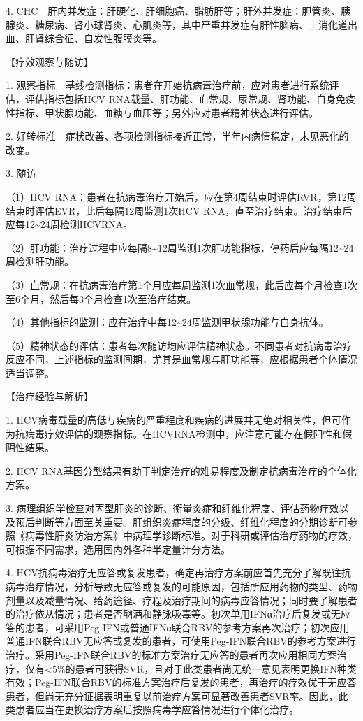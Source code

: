 4.
CHC　肝内并发症：肝硬化、肝细胞癌、脂肪肝等；肝外并发症：胆管炎、胰腺炎、糖尿病、肾小球肾炎、心肌炎等，其中严重并发症有肝性脑病、上消化道出血、肝肾综合征、自发性腹膜炎等。

【疗效观察与随访】

1.
观察指标　基线检测指标：患者在开始抗病毒治疗前，应对患者进行系统评估，评估指标包括HCV
RNA载量、肝功能、血常规、尿常规、肾功能、自身免疫性指标、甲状腺功能、血糖与血压等；另外应对患者精神状态进行评估。

2.
好转标准　症状改善、各项检测指标接近正常，半年内病情稳定，未见恶化的改变。

3. 随访

（1）HCV
RNA：患者在抗病毒治疗开始后，应在第4周结束时评估RVR，第12周结束时评估EVR，此后每隔12周监测1次HCV
RNA，直至治疗结束。治疗结束后应每12\textasciitilde{}24周检测HCVRNA。

（2）肝功能：治疗过程中应每隔8\textasciitilde{}12周监测1次肝功能指标，停药后应每隔12\textasciitilde{}24周检测肝功能。

（3）血常规：在抗病毒治疗第1个月应每周监测1次血常规，此后应每个月检查1次至6个月，然后每3个月检查1次至治疗结束。

（4）其他指标的监测：应在治疗中每12\textasciitilde{}24周监测甲状腺功能与自身抗体。

（5）精神状态的评估：患者每次随访均应评估精神状态。不同患者对抗病毒治疗反应不同，上述指标的监测间期，尤其是血常规与肝功能等，应根据患者个体情况适当调整。

【治疗经验与解析】

1.
HCV病毒载量的高低与疾病的严重程度和疾病的进展并无绝对相关性，但可作为抗病毒疗效评估的观察指标。在HCVRNA检测中，应注意可能存在假阳性和假阴性结果。

2. HCV
RNA基因分型结果有助于判定治疗的难易程度及制定抗病毒治疗的个体化方案。

3.
病理组织学检查对丙型肝炎的诊断、衡量炎症和纤维化程度、评估药物疗效以及预后判断等方面至关重要。肝组织炎症程度的分级、纤维化程度的分期诊断可参照《病毒性肝炎防治方案》中病理学诊断标准。对于科研或评估治疗药物的疗效，可根据不同需求，选用国内外各种半定量计分方法。

4.
HCV抗病毒治疗无应答或复发患者，确定再治疗方案前应首先充分了解既往抗病毒治疗情况，分析导致无应答或复发的可能原因，包括所应用药物的类型、药物剂量以及减量情况、给药途径、疗程及治疗期间的病毒应答情况；同时要了解患者的治疗依从情况；患者是否酗酒和静脉吸毒等。初次单用IFNα治疗后复发或无应答的患者，可采用Peg-IFN或普通IFNα联合RBV的参考方案再次治疗；初次应用普通IFN联合RBV无应答或复发的患者，可使用Peg-IFN联合RBV的参考方案进行治疗。采用Peg-IFN联合RBV的标准方案治疗无应答的患者再次应用相同方案治疗，仅有\textless{}5\%的患者可获得SVR，且对于此类患者尚无统一意见表明更换IFN种类有效；Peg-IFN联合RBV的标准方案治疗后复发的患者，再治疗的疗效优于无应答患者，但尚无充分证据表明重复以前治疗方案可显著改善患者SVR率。因此，此类患者应当在更换治疗方案后按照病毒学应答情况进行个体化治疗。

